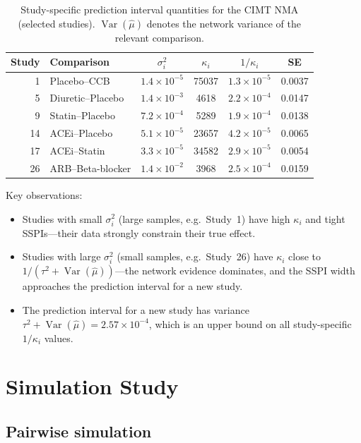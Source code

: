 \documentclass[12pt]{article}
\newcommand{\Var}{\operatorname{Var}}
\begin{document}
\begin{table}[h]
\centering
\caption{Study-specific prediction interval quantities for the CIMT NMA
(selected studies).  $\Var(\hat\mu)$ denotes the network variance of
the relevant comparison.}
\label{tab:example}
\begin{tabular}{rlcccc}
\toprule
Study & Comparison & $\sigma_i^2$ & $\kappa_i$ & $1/\kappa_i$ & SE \\
\midrule
 1 & Placebo--CCB         & $1.4\!\times\!10^{-5}$ & 75037 & $1.3\!\times\!10^{-5}$ & 0.0037 \\
 5 & Diuretic--Placebo    & $1.4\!\times\!10^{-3}$ & 4618  & $2.2\!\times\!10^{-4}$ & 0.0147 \\
 9 & Statin--Placebo      & $7.2\!\times\!10^{-4}$ & 5289  & $1.9\!\times\!10^{-4}$ & 0.0138 \\
14 & ACEi--Placebo        & $5.1\!\times\!10^{-5}$ & 23657 & $4.2\!\times\!10^{-5}$ & 0.0065 \\
17 & ACEi--Statin         & $3.3\!\times\!10^{-5}$ & 34582 & $2.9\!\times\!10^{-5}$ & 0.0054 \\
26 & ARB--Beta-blocker    & $1.4\!\times\!10^{-2}$ & 3968  & $2.5\!\times\!10^{-4}$ & 0.0159 \\
\bottomrule
\end{tabular}
\end{table}

Key observations:
\begin{itemize}
  \item Studies with small $\sigma_i^2$ (large samples, e.g.\ Study~1)
    have high $\kappa_i$ and tight SSPIs---their data strongly constrain
    their true effect.
  \item Studies with large $\sigma_i^2$ (small samples, e.g.\ Study~26)
    have $\kappa_i$ close to $1/(\tau^2 + \Var(\hat\mu))$---the network
    evidence dominates, and the SSPI width approaches the prediction
    interval for a new study.
  \item The prediction interval for a new study has variance
    $\tau^2 + \Var(\hat\mu) = 2.57 \times 10^{-4}$, which is an upper
    bound on all study-specific $1/\kappa_i$ values.
\end{itemize}


\section{Simulation Study}\label{sec:simulation}

\subsection{Pairwise simulation}
\end{document}

